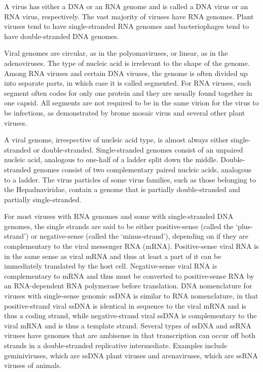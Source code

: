 A virus has either a DNA or an RNA genome and is called a DNA virus or an RNA virus, respectively. The vast majority of viruses have RNA genomes. Plant viruses tend to have single-stranded RNA genomes and bacteriophages tend to have double-stranded DNA genomes.

Viral genomes are circular, as in the polyomaviruses, or linear, as in the adenoviruses. The type of nucleic acid is irrelevant to the shape of the genome. Among RNA viruses and certain DNA viruses, the genome is often divided up into separate parts, in which case it is called segmented. For RNA viruses, each segment often codes for only one protein and they are usually found together in one capsid. All segments are not required to be in the same virion for the virus to be infectious, as demonstrated by brome mosaic virus and several other plant viruses.

A viral genome, irrespective of nucleic acid type, is almost always either single-stranded or double-stranded. Single-stranded genomes consist of an unpaired nucleic acid, analogous to one-half of a ladder split down the middle. Double-stranded genomes consist of two complementary paired nucleic acids, analogous to a ladder. The virus particles of some virus families, such as those belonging to the Hepadnaviridae, contain a genome that is partially double-stranded and partially single-stranded.

For most viruses with RNA genomes and some with single-stranded DNA genomes, the single strands are said to be either positive-sense (called the `plus-strand') or negative-sense (called the `minus-strand'), depending on if they are complementary to the viral messenger RNA (mRNA). Positive-sense viral RNA is in the same sense as viral mRNA and thus at least a part of it can be immediately translated by the host cell. Negative-sense viral RNA is complementary to mRNA and thus must be converted to positive-sense RNA by an RNA-dependent RNA polymerase before translation. DNA nomenclature for viruses with single-sense genomic ssDNA is similar to RNA nomenclature, in that positive-strand viral ssDNA is identical in sequence to the viral mRNA and is thus a coding strand, while negative-strand viral ssDNA is complementary to the viral mRNA and is thus a template strand. Several types of ssDNA and ssRNA viruses have genomes that are ambisense in that transcription can occur off both strands in a double-stranded replicative intermediate. Examples include geminiviruses, which are ssDNA plant viruses and arenaviruses, which are ssRNA viruses of animals.



